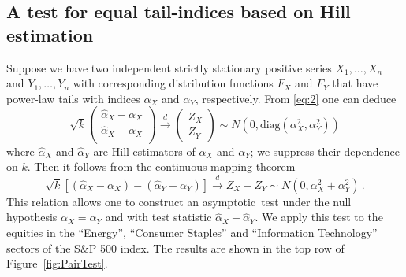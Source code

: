 \documentclass[11pt,a4]{amsart}
\newcommand{\asy}{asymptotic}
\newcommand{\df}{distribution function}
\newcommand{\1}{{\mathbf 1}}
\begin{document}
\subsection{A test for equal tail-indices based on Hill estimation}
Suppose we have two independent strictly stationary positive series $X_1, \dots, X_n $ and
$Y_1, \dots, Y_n$ with corresponding \df s $F_X$ and $F_Y$ that have power-law tails
with indices $\alpha_X$ and $\alpha_Y$, respectively. 
From \eqref{eq:2} one can deduce
\begin{equation}
  \label{eq:x3}
  \sqrt k
  \begin{pmatrix}
    {\hat \alpha_X - \alpha_X} \\
    {\hat \alpha_X - \alpha_X} \\
  \end{pmatrix} \overset{d}{\to}
  \begin{pmatrix}
    Z_X \\
    Z_Y
  \end{pmatrix}
  \sim
  N\left(
    0, \text{diag}(\alpha_X^2, \alpha_Y^2)
  \right)
\end{equation}
where $\hat \alpha_X$ and $\hat \alpha_Y$ are Hill estimators of
$\alpha_X$ and $\alpha_Y$; we suppress their dependence on $k$. Then it follows from the continuous mapping
theorem
\begin{equation}
  \label{eq:x1}
  \sqrt k [(\hat \alpha_X -\alpha_X) - (\hat \alpha_Y - \alpha_Y)]
  \overset{d}{\to}
  Z_X - Z_Y \sim N(0, \alpha_X^2 + \alpha_Y^2)\,.
\end{equation}
This relation allows one to construct an \asy\ test under 
the null hypothesis $\alpha_X = \alpha_Y$ and with test statistic $\hat \alpha_X - \hat \alpha_Y$.
We apply this test to the equities in the ``Energy'',
``Consumer Staples'' and ``Information Technology''
sectors of the S\&P 500 index. The results are shown in the top row of
Figure~\ref{fig:PairTest}.
\end{document}
